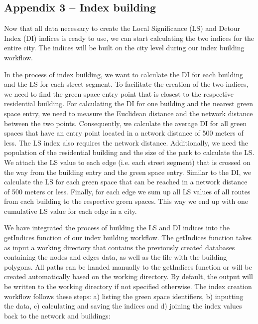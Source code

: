 \documentclass[10pt]{article}
\begin{document}
\subsection{Appendix 3 – Index building}
Now that all data necessary to create the Local Significance (LS) and Detour Index (DI) indices is ready to use, we can start calculating the two indices for the entire city.
The indices will be built on the city level during our index building workflow.

In the process of index building, we want to calculate the DI for each building and the LS for each street segment.
To facilitate the creation of the two indices, we need to find the green space entry point that is closest to the respective residential building.
For calculating the DI for one building and the nearest green space entry, we need to measure the Euclidean distance and the network distance between the two points.
Consequently, we calculate the average DI for all green spaces that have an entry point located in a network distance of 500 meters of less.
The LS index also requires the network distance.
Additionally, we need the population of the residential building and the size of the park to calculate the LS.
We attach the LS value to each edge (i.e. each street segment) that is crossed on the way from the building entry and the green space entry. 
Similar to the DI, we calculate the LS for each green space that can be reached in a network distance of 500 meters or less.
Finally, for each edge we sum up all LS values of all routes from each building to the respective green spaces.
This way we end up with one cumulative LS value for each edge in a city.

We have integrated the process of building the LS and DI indices into the getIndices function of our index building workflow.
The getIndices function takes as input a working directory that contains the previously created databases containing the nodes and edges data, as well as the file with the building polygons.
All paths can be handed manually to the getIndices function or will be created automatically based on the working directory.
By default, the output will be written to the working directory if not specified otherwise.
The index creation workflow follows these steps: a) listing the green space identifiers, b) inputting the data, c) calculating and saving the indices and d) joining the index values back to the network and buildings:
\end{document}
